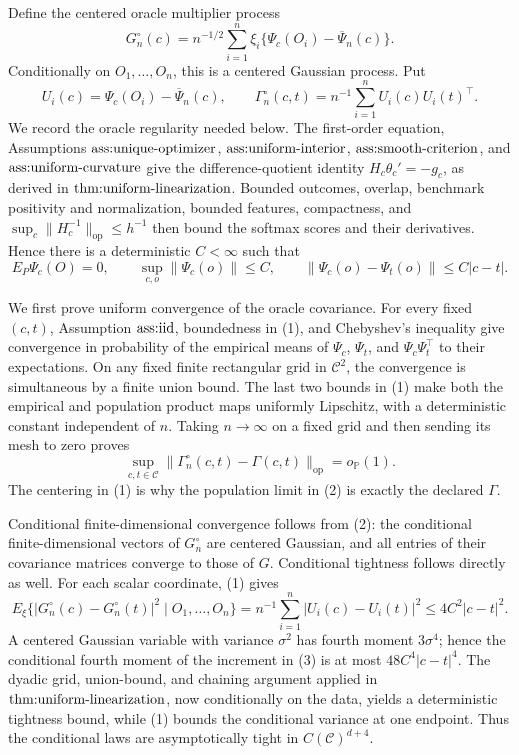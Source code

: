 Define the centered oracle multiplier process
\[
 G_n^\circ(c)=n^{-1/2}\sum_{i=1}^n\xi_i
 \{\Psi_c(O_i)-\overline\Psi_n(c)\}.
\]
Conditionally on \(O_1,\ldots,O_n\), this is a centered Gaussian process.  Put
\[
 U_i(c)=\Psi_c(O_i)-\overline\Psi_n(c),
 \qquad
 \Gamma_n^\circ(c,t)=n^{-1}\sum_{i=1}^nU_i(c)U_i(t)^\top.
\]
We record the oracle regularity needed below.  The first-order equation, Assumptions \(\textnormal{ass:unique-optimizer}\), \(\textnormal{ass:uniform-interior}\), \(\textnormal{ass:smooth-criterion}\), and \(\textnormal{ass:uniform-curvature}\) give the difference-quotient identity \(H_c\theta_c'=-g_c\), as derived in \(\textnormal{thm:uniform-linearization}\).  Bounded outcomes, overlap, benchmark positivity and normalization, bounded features, compactness, and \(\sup_c\|H_c^{-1}\|_{\mathrm{op}}\le h^{-1}\) then bound the softmax scores and their derivatives.  Hence there is a deterministic \(C<\infty\) such that
\[
 E_P\Psi_c(O)=0,
 \qquad
 \sup_{c,o}\|\Psi_c(o)\|\le C,
 \qquad
 \|\Psi_c(o)-\Psi_t(o)\|\le C|c-t|. \tag{1}
\]

We first prove uniform convergence of the oracle covariance.  For every fixed \((c,t)\), Assumption \(\textnormal{ass:iid}\), boundedness in (1), and Chebyshev's inequality give convergence in probability of the empirical means of \(\Psi_c\), \(\Psi_t\), and \(\Psi_c\Psi_t^\top\) to their expectations.  On any fixed finite rectangular grid in \(\mathcal C^2\), the convergence is simultaneous by a finite union bound.  The last two bounds in (1) make both the empirical and population product maps uniformly Lipschitz, with a deterministic constant independent of \(n\).  Taking \(n\to\infty\) on a fixed grid and then sending its mesh to zero proves
\[
 \sup_{c,t\in\mathcal C}
 \|\Gamma_n^\circ(c,t)-\Gamma(c,t)\|_{\mathrm{op}}
 =o_{\mathbb P}(1). \tag{2}
\]
The centering in (1) is why the population limit in (2) is exactly the declared \(\Gamma\).

Conditional finite-dimensional convergence follows from (2): the conditional finite-dimensional vectors of \(G_n^\circ\) are centered Gaussian, and all entries of their covariance matrices converge to those of \(G\).  Conditional tightness follows directly as well.  For each scalar coordinate, (1) gives
\[
 E_\xi\{|G_n^\circ(c)-G_n^\circ(t)|^2\mid O_1,\ldots,O_n\}
 =n^{-1}\sum_{i=1}^n|U_i(c)-U_i(t)|^2
 \le4C^2|c-t|^2. \tag{3}
\]
A centered Gaussian variable with variance \(\sigma^2\) has fourth moment \(3\sigma^4\); hence the conditional fourth moment of the increment in (3) is at most \(48C^4|c-t|^4\).  The dyadic grid, union-bound, and chaining argument applied in \(\textnormal{thm:uniform-linearization}\), now conditionally on the data, yields a deterministic tightness bound, while (1) bounds the conditional variance at one endpoint.  Thus the conditional laws are asymptotically tight in \(C(\mathcal C)^{d+4}\).

